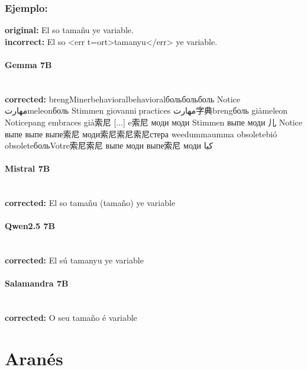 \subsubsection{Ejemplo:}
\textbf{original:} El so tamañu ye variable.\\
\textbf{incorrect:} El so {\textless}err t=ort{\textgreater}tamanyu{\textless}/err{\textgreater} ye variable.

\paragraph{Gemma 7B}~\\
\textbf{corrected:} brengMinerbehavioralbehavioralбольбольболь Notice مهارتmeleonболь Stimmen giovanni🥈practices مهارت字典brengболь giảmeleon Noticepang embraces giả索尼  [...] e索尼 моди моди Stimmen выпе моди 儿 Notice выпе выпе выпе索尼 моди索尼索尼索尼стера weedummaumma obsoletebió obsoleteбольVotre索尼索尼 выпе моди выпе索尼 моди کیا

\paragraph{Mistral 7B}~\\
\textbf{corrected:} El so tamañu (tamaño) ye variable

\paragraph{Qwen2.5 7B}~\\
\textbf{corrected:} El sú tamanyu ye variable

\paragraph{Salamandra 7B}~\\
\textbf{corrected:} O seu tamaño é variable

\vspace{1em}

\section{Aranés}


